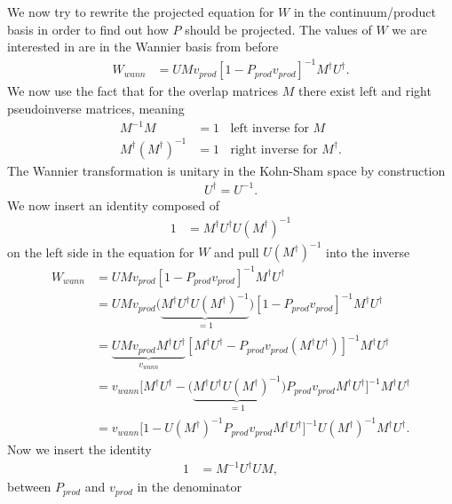 \documentclass[12pt,a4paper]{scrartcl}
\numberwithin{equation}{section}
\begin{document}
\bigskip

We now try to rewrite the projected equation for $W$ in the continuum/product basis in order
to find out how $P$ should be projected. The values of $W$ we are interested in are in the Wannier basis
from before 
\begin{align}
 W_{wann}  &=  U M v_{prod} \left[ 1 - P_{prod}v_{prod} \right]^{-1} M^{\dagger} U^{\dagger} .
\end{align}
We now use the fact that for the overlap matrices $M$ there exist left and right pseudoinverse matrices, meaning
\begin{align}
 M^{-1} M &= 1 \ \ \ \ \mbox{left inverse for }M\\
 M^{\dagger} (M^{\dagger})^{-1} &= 1 \ \ \ \ \mbox{right inverse for }M^{\dagger}.
\end{align}
The Wannier transformation is unitary in the Kohn-Sham space by construction
\begin{align}
 U^{\dagger} = U^{-1}.
\end{align}
We now insert an identity composed of 
\begin{align}
 1 &= M^{\dagger} U^{\dagger} U (M^{\dagger})^{-1}
\end{align}
on the left side in the equation for $W$ and pull $U (M^{\dagger})^{-1}$ into the inverse
\begin{align}
 W_{wann}  
 &=  U M v_{prod} \left[ 1 - P_{prod}v_{prod} \right]^{-1} M^{\dagger} U^{\dagger} \\
 &=  U M v_{prod} \Big( \underbrace{ M^{\dagger} U^{\dagger} U (M^{\dagger})^{-1} }_{=1} \Big) \left[ 1 - P_{prod}v_{prod} \right]^{-1} M^{\dagger} U^{\dagger} \\
 &=  \underbrace{U M v_{prod}  M^{\dagger} U^{\dagger}}_{v_{wann}} \left[ M^{\dagger} U^{\dagger} - P_{prod}v_{prod} \left(  M^{\dagger} U^{\dagger} \right)\right]^{-1} M^{\dagger} U^{\dagger} \\
 &=  v_{wann} \Big[ M^{\dagger} U^{\dagger} - \Big(\underbrace{ M^{\dagger} U^{\dagger} U (M^{\dagger})^{-1} }_{=1} \Big)P_{prod}v_{prod}  M^{\dagger} U^{\dagger} \Big]^{-1} M^{\dagger} U^{\dagger} \\
 &=  v_{wann} \Big[ 1 - U (M^{\dagger})^{-1}  P_{prod}v_{prod}  M^{\dagger} U^{\dagger} \Big]^{-1} U (M^{\dagger})^{-1}M^{\dagger} U^{\dagger} .
\end{align}
Now we insert the identity
\begin{align}
 1 &= M^{-1} U^{\dagger} U M,
\end{align}
between $P_{prod}$ and $v_{prod}$ in the denominator
\end{document}

